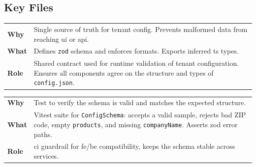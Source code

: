 \documentclass[11pt, a4paper, oneside, listof=totoc]{scrartcl}
\makeatletter
\newcommand{\codesummary}[3]{%
    \vspace{0.4\baselineskip}%
    \noindent\begin{tabularx}{\linewidth}{@{}>{\bfseries}l X@{}}
    Why  & #1\\
    What & #2\\
    Role & #3\\
    \end{tabularx}%
    \vspace{0.2\baselineskip}%
}
\makeatother
\begin{document}
            \subsection{Key Files}
                \codesummary
                    {Single source of truth for tenant config. Prevents malformed data from reaching \gls{ui} or \gls{api}.}
                    {Defines \texttt{zod} schema and enforces formats. Exports inferred \gls{ts} types.}
                    {Shared contract used for runtime validation of tenant configuration. Ensures all components agree on the structure and types of \texttt{config.json}.}

        \clearpage

                \codesummary
                    {Test to verify the schema is valid and matches the expected structure.}
                    {Vitest suite for \texttt{ConfigSchema}: accepts a valid sample, rejects bad ZIP code, empty \texttt{products}, and missing \texttt{companyName}. Asserts zod error paths.}
                    {\gls{ci} guardrail for \gls{fe}/\gls{be} compatibility, keeps the schema stable across services.}

        \clearpage
\end{document}
